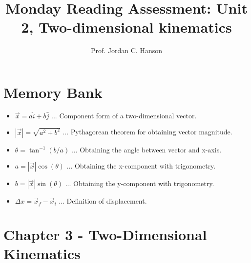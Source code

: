 \documentclass{article}
\begin{document}
\title{Monday Reading Assessment: Unit 2, Two-dimensional kinematics}
\author{Prof. Jordan C. Hanson}

\maketitle

\section{Memory Bank}

\begin{itemize}
\item $\vec{x} = a \hat{i} + b\hat{j}$ ... Component form of a two-dimensional vector.
\item $|\vec{x}| = \sqrt{a^2+b^2}$ ... Pythagorean theorem for obtaining vector magnitude.
\item $\theta = \tan^{-1}(b/a)$ ... Obtaining the angle between vector and x-axis.
\item $a = |\vec{x}|\cos(\theta)$ ... Obtaining the x-component with trigonometry.
\item $b = |\vec{x}|\sin(\theta)$ ... Obtaining the y-component with trigonometry.
\item $\Delta x = \vec{x}_f - \vec{x}_i$ ... Definition of displacement.
\end{itemize}

\section{Chapter 3 - Two-Dimensional Kinematics}
\end{document}

